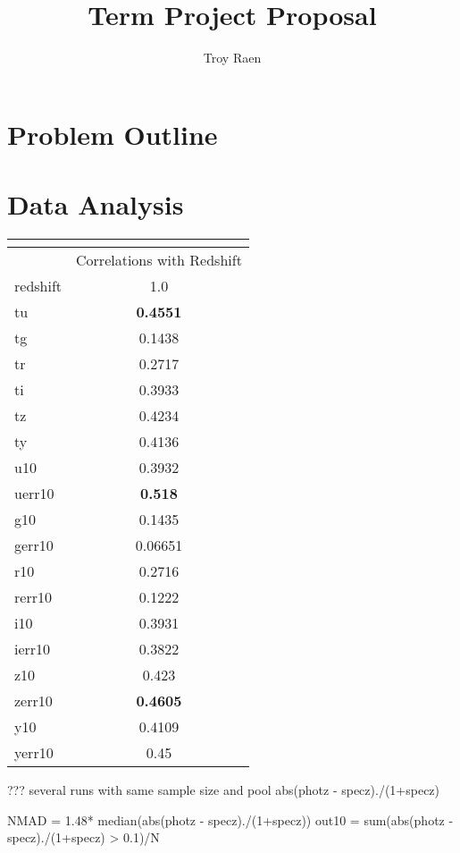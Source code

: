\documentclass[13pt]{amsart}
\title{Term Project Proposal}
\author{Troy Raen}
\begin{document}
\maketitle



\section{Problem Outline}


\section{Data Analysis}


\begin{center}
\begin{tabular}{|l|c|}
\multicolumn{2}{c}{} \\ \hline 
 & Correlations with Redshift \\ \hline
redshift & 1.0 \\ \hline
tu & \textbf{0.4551} \\ \hline
tg & 0.1438 \\ \hline
tr & 0.2717 \\ \hline
ti & 0.3933 \\ \hline
tz & 0.4234 \\ \hline
ty & 0.4136 \\ \hline
u10 & 0.3932 \\ \hline
uerr10 & \textbf{0.518} \\ \hline
g10 & 0.1435 \\ \hline
gerr10 & 0.06651 \\ \hline
r10 & 0.2716 \\ \hline
rerr10 & 0.1222 \\ \hline
i10 & 0.3931 \\ \hline
ierr10 & 0.3822 \\ \hline
z10 & 0.423 \\ \hline
zerr10 & \textbf{0.4605} \\ \hline
y10 & 0.4109 \\ \hline
yerr10 & 0.45 \\ \hline
\end{tabular}
\end{center}


??? 
several runs with same sample size and pool abs(photz - specz)./(1+specz)

NMAD = 1.48* median(abs(photz - specz)./(1+specz))
out10 = sum(abs(photz - specz)./(1+specz) > 0.1)/N
\end{document}
